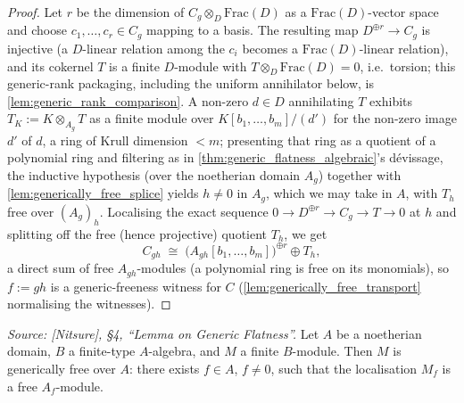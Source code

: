 \begin{proof}
  Let \(r\) be the dimension of \(C_g \otimes_D \mathrm{Frac}(D)\) as a
  \(\mathrm{Frac}(D)\)-vector space and choose \(c_1, \dots, c_r \in C_g\)
  mapping to a basis.  The resulting map \(D^{\oplus r} \to C_g\) is injective
  (a \(D\)-linear relation among the \(c_i\) becomes a
  \(\mathrm{Frac}(D)\)-linear relation), and its cokernel \(T\) is a finite
  \(D\)-module with \(T \otimes_D \mathrm{Frac}(D) = 0\), i.e.\ torsion;
  this generic-rank packaging, including the uniform annihilator below, is
  \cref{lem:generic_rank_comparison}.  A
  non-zero \(d \in D\) annihilating \(T\) exhibits
  \(T_K := K \otimes_{A_g} T\) as a finite module over
  \(K[b_1, \dots, b_m]/(d')\) for the non-zero image \(d'\) of \(d\), a ring of
  Krull dimension \(< m\); presenting that ring as a quotient of a polynomial
  ring and filtering as in \cref{thm:generic_flatness_algebraic}'s dévissage,
  the inductive hypothesis (over the noetherian domain \(A_g\)) together with
  \cref{lem:generically_free_splice} yields \(h \ne 0\) in \(A_g\), which we
  may take in \(A\), with \(T_h\) free over \((A_g)_h\).  Localising the exact
  sequence \(0 \to D^{\oplus r} \to C_g \to T \to 0\) at \(h\) and splitting
  off the free (hence projective) quotient \(T_h\), we get
  \[
    C_{gh} \;\cong\; \bigl(A_{gh}[b_1, \dots, b_m]\bigr)^{\oplus r} \oplus T_h ,
  \]
  a direct sum of free \(A_{gh}\)-modules (a polynomial ring is free on its
  monomials), so \(f := gh\) is a generic-freeness witness for \(C\)
  (\cref{lem:generically_free_transport} normalising the witnesses).
\end{proof}

\begin{theorem}
  \label{thm:generic_flatness_algebraic}
  \textit{Source: [Nitsure], \S4, ``Lemma on Generic Flatness''.}
  Let \(A\) be a noetherian domain, \(B\) a finite-type \(A\)-algebra, and \(M\) a finite
  \(B\)-module. Then \(M\) is generically free over \(A\): there exists
  \(f \in A\), \(f \ne 0\), such that the localisation
  \(M_f\) is a free \(A_f\)-module.
\end{theorem}


